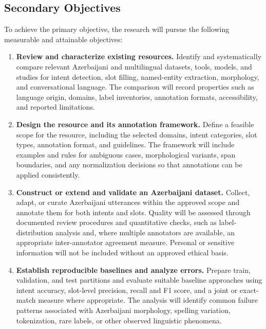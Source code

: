 \documentclass[12pt,a4paper]{article}
\begin{document}
\subsection{Secondary Objectives}

To achieve the primary objective, the research will pursue the following measurable and attainable objectives:

\begin{enumerate}
    \item \textbf{Review and characterize existing resources.} Identify and systematically compare relevant Azerbaijani and multilingual datasets, tools, models, and studies for intent detection, slot filling, named-entity extraction, morphology, and conversational language. The comparison will record properties such as language origin, domains, label inventories, annotation formats, accessibility, and reported limitations.

    \item \textbf{Design the resource and its annotation framework.} Define a feasible scope for the resource, including the selected domains, intent categories, slot types, annotation format, and guidelines. The framework will include examples and rules for ambiguous cases, morphological variants, span boundaries, and any normalization decisions so that annotations can be applied consistently.

    \item \textbf{Construct or extend and validate an Azerbaijani dataset.} Collect, adapt, or curate Azerbaijani utterances within the approved scope and annotate them for both intents and slots. Quality will be assessed through documented review procedures and quantitative checks, such as label-distribution analysis and, where multiple annotators are available, an appropriate inter-annotator agreement measure. Personal or sensitive information will not be included without an approved ethical basis.

    \item \textbf{Establish reproducible baselines and analyze errors.} Prepare train, validation, and test partitions and evaluate suitable baseline approaches using intent accuracy, slot-level precision, recall and F1 score, and a joint or exact-match measure where appropriate. The analysis will identify common failure patterns associated with Azerbaijani morphology, spelling variation, tokenization, rare labels, or other observed linguistic phenomena.
\end{enumerate}
\end{document}
